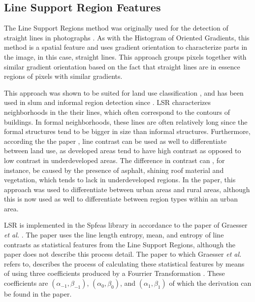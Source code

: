 \subsection{Line Support Region Features}

The Line Support Regions method was originally used for the detection of straight lines in photographs \cite{burns1986extracting}. As with the Histogram of Oriented Gradients, this method is a spatial feature and uses gradient orientation to characterize parts in the image, in this case, straight lines. This approach groups pixels together with similar gradient orientation based on the fact that straight lines are in essence regions of pixels with similar gradients. 

This approach was shown to be suited for land use classification \cite{unsalan2004classifying} \cite{unsalan2006gradient}, and has been used in slum and informal region detection since \cite{graesser2012image} \cite{accra} \cite{colombo}. LSR characterizes neighborhoods in the their lines, which often correspond to the contours of buildings. In formal neighborhoods, these lines are often relatively long since the formal structures tend to be bigger in size than informal structures. Furthermore, according the the paper \cite{unsalan2004classifying}, line contrast can be used as well to differentiate between land use, as developed areas tend to have high contrast as opposed to low contrast in underdeveloped areas. The difference in contrast can , for instance, be caused by the presence of asphalt, shining roof material and vegetation, which tends to lack in underdeveloped regions. In the paper, this approach was used to differentiate between urban areas and rural areas, although this is now used as well to differentiate between region types within an urban area.

LSR is implemented in the Spfeas library in accordance to the paper of Graesser \textit{et al.} \cite{graesser2012image}. The paper uses the line length entropy, mean, and entropy of line contrasts as statistical features from the Line Support Regions, although the paper does not describe this process detail. The paper to which Graesser \textit{et al.} refers to, describes the process of calculating these statistical features by means of using three coefficients produced by a Fourrier Transformation \cite{unsalan2004classifying}. These coefficients are $(\alpha_{-1}, \beta_{-1})$, $(\alpha_{0}, \beta_{0})$, and $(\alpha_{1}, \beta_{1})$ of which the derivation can be found in the paper.

